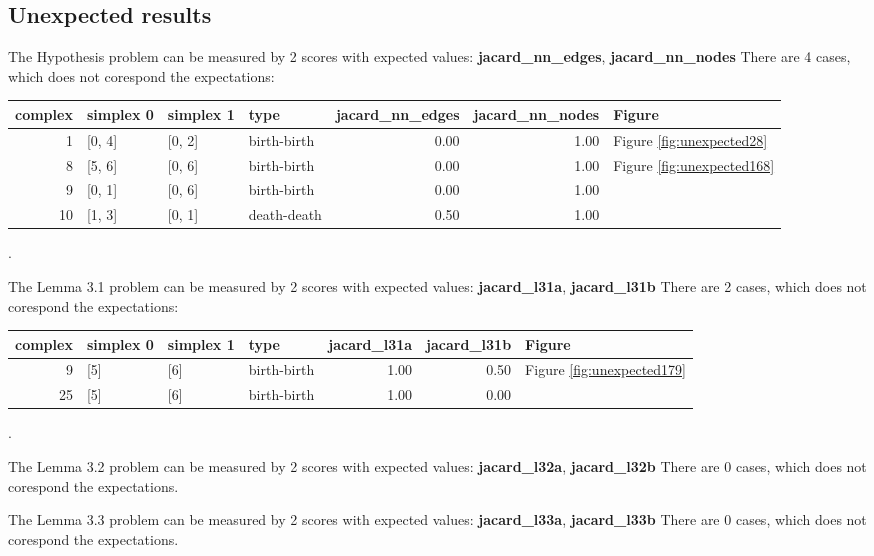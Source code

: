 \documentclass{article}
\begin{document}
\subsection{Unexpected results}

\par The Hypothesis problem can be measured by 2 scores with expected
values: \textbf{jacard\_nn\_edges}, \textbf{jacard\_nn\_nodes}
There are 4 cases, which does not corespond the expectations:
\begin{center}
\begin{tabular}{rlllrrl}
\toprule
complex & simplex 0 & simplex 1 & type & jacard\_nn\_edges & jacard\_nn\_nodes & Figure \\
\midrule
1 & [0, 4] & [0, 2] & birth-birth & 0.00 & 1.00 & Figure \ref{fig:unexpected28} \\
8 & [5, 6] & [0, 6] & birth-birth & 0.00 & 1.00 & Figure \ref{fig:unexpected168} \\
9 & [0, 1] & [0, 6] & birth-birth & 0.00 & 1.00 &  \\
10 & [1, 3] & [0, 1] & death-death & 0.50 & 1.00 &  \\
\bottomrule
\end{tabular}
\end{center}.

\par The Lemma 3.1 problem can be measured by 2 scores with expected
values: \textbf{jacard\_l31a}, \textbf{jacard\_l31b}
There are 2 cases, which does not corespond the expectations:
\begin{center}
\begin{tabular}{rlllrrl}
\toprule
complex & simplex 0 & simplex 1 & type & jacard\_l31a & jacard\_l31b & Figure \\
\midrule
9 & [5] & [6] & birth-birth & 1.00 & 0.50 & Figure \ref{fig:unexpected179} \\
25 & [5] & [6] & birth-birth & 1.00 & 0.00 &  \\
\bottomrule
\end{tabular}
\end{center}.

\par The Lemma 3.2 problem can be measured by 2 scores with expected
values: \textbf{jacard\_l32a}, \textbf{jacard\_l32b}
There are 0 cases, which does not corespond the expectations.

\par The Lemma 3.3 problem can be measured by 2 scores with expected
values: \textbf{jacard\_l33a}, \textbf{jacard\_l33b}
There are 0 cases, which does not corespond the expectations.
\end{document}
